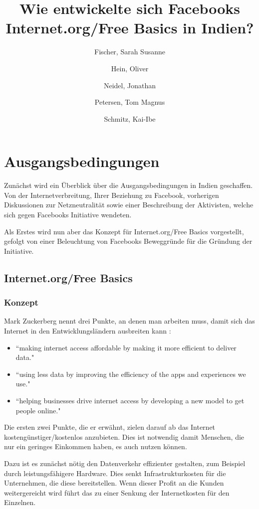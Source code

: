 \documentclass{article}
\title{Wie entwickelte sich Facebooks Internet.org/Free Basics in Indien?}
\author{
  Fischer, Sarah Susanne\\
  \and
  Hein, Oliver\\
  \and
  Neidel, Jonathan\\
  \and
  Petersen, Tom Magnus\\
  \and
  Schmitz, Kai-Ibe\\
}
\begin{document}
\maketitle

\section{Ausgangsbedingungen}

Zunächst wird ein Überblick über die Ausgangsbedingungen in Indien geschaffen. Von der Internetverbreitung, Ihrer Beziehung zu Facebook, vorherigen Diskussionen zur Netzneutralität sowie einer Beschreibung der Aktivisten, welche sich gegen Facebooks Initiative wendeten.

Als Erstes wird nun aber das Konzept für Internet.org/Free Basics vorgestellt, gefolgt von einer Beleuchtung von Facebooks Beweggründe für die Gründung der Initiative.

\subsection{Internet.org/Free Basics}

\subsubsection{Konzept}
        
Mark Zuckerberg nennt drei Punkte, an denen man arbeiten muss, damit sich das Internet in den Entwicklungsländern ausbreiten kann
\parencite{HumanRight}:

\begin{itemize}
\item ``making internet access affordable by making it more efficient to deliver data."
\item ``using less data by improving the efficiency of the apps and experiences we use."
\item ``helping businesses drive internet access by developing a new model to get people online."  
\end{itemize}

Die ersten zwei Punkte, die er erwähnt, zielen darauf ab das Internet kostengünstiger/kostenlos anzubieten. 
Dies ist notwendig damit Menschen, die nur ein geringes Einkommen haben, es auch nutzen können.

Dazu ist es zunächst nötig den Datenverkehr effizienter gestalten, zum Beispiel durch leistungsfähigere Hardware.
Dies senkt Infrastrukturkosten für die Unternehmen, die diese bereitstellen.
Wenn dieser Profit an die Kunden weitergereicht wird führt das zu einer Senkung der Internetkosten für den Einzelnen.
\end{document}
